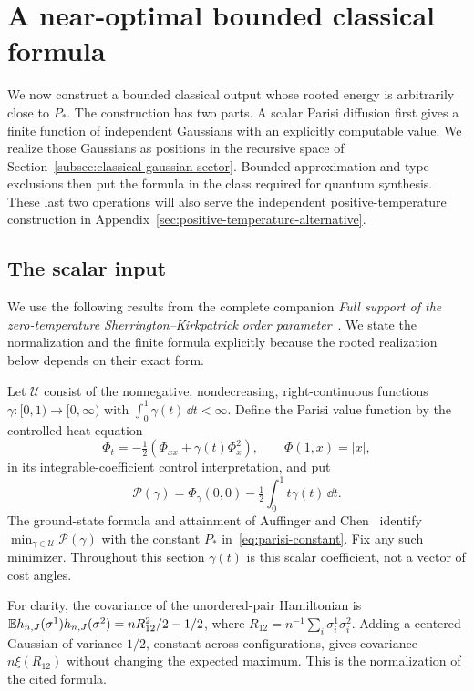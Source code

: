 \section{A near-optimal bounded classical formula}
\label{sec:classical-optimization}

We now construct a bounded classical output whose rooted energy is
arbitrarily close to $P_*$. The construction has two parts. A scalar
Parisi diffusion first gives a finite function of independent Gaussians
with an explicitly computable value. We realize those Gaussians as
positions in the recursive space of
Section~\ref{subsec:classical-gaussian-sector}. Bounded approximation
and type exclusions then put the formula in the class required for
quantum synthesis. These last two operations will also serve the
independent positive-temperature construction in
Appendix~\ref{sec:positive-temperature-alternative}.

\subsection{The scalar input}

We use the following results from the complete companion
\emph{Full support of the zero-temperature Sherrington--Kirkpatrick
order parameter}~\cite{SKSupport2026}. We state the normalization and
the finite formula explicitly because the rooted realization below
depends on their exact form.

Let $\mathcal U$ consist of the nonnegative, nondecreasing,
right-continuous functions $\gamma:[0,1)\to[0,\infty)$ with
$\int_0^1\gamma(t)\,\dd t<\infty$. Define the Parisi value function
by the controlled heat equation
\[
 \Phi_t=-\tfrac12(\Phi_{xx}+\gamma(t)\Phi_x^2),
 \qquad \Phi(1,x)=|x|,
\]
in its integrable-coefficient control interpretation, and put
\[
 \mathcal P(\gamma)=\Phi_\gamma(0,0)
                 -\tfrac12\int_0^1t\gamma(t)\,\dd t.
\]
The ground-state formula and attainment of Auffinger and
Chen~\cite[Theorem~1 and the proof of Lemma~3]{AC2017} identify
$\min_{\gamma\in\mathcal U}\mathcal P(\gamma)$ with the constant
$P_*$ in~\eqref{eq:parisi-constant}. Fix any such minimizer.
Throughout this section $\gamma(t)$ is this scalar coefficient,
not a vector of cost angles.

For clarity, the covariance of the unordered-pair Hamiltonian is
$\mathbb E h_{n,J}(\sigma^1)h_{n,J}(\sigma^2)=nR_{12}^2/2-1/2$, where
$R_{12}=n^{-1}\sum_i\sigma_i^1\sigma_i^2$. Adding a centered
Gaussian of variance $1/2$, constant across configurations, gives
covariance $n\xi(R_{12})$ without changing the expected maximum.
This is the normalization of the cited formula.

